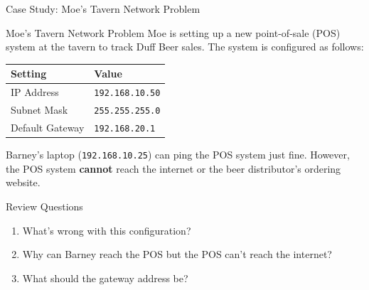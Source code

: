 \documentclass[aspectratio=169]{beamer}  %
\begin{document}
\begin{frame}{Case Study: Moe's Tavern Network Problem}
    \begin{casestudy}{Moe's Tavern Network Problem}
        Moe is setting up a new point-of-sale (POS) system at the tavern to track Duff Beer sales. The system is configured as follows:
        
        \vspace{0.5em}
        \begin{center}
            \scriptsize
            \begin{tabular}{l l}
                \textbf{Setting} & \textbf{Value} \\
                \midrule
                IP Address & \texttt{192.168.10.50} \\
                Subnet Mask & \texttt{255.255.255.0} \\
                Default Gateway & \texttt{192.168.20.1} \\
            \end{tabular}
        \end{center}
        
        Barney's laptop (\texttt{192.168.10.25}) can ping the POS system just fine. However, the POS system \textbf{cannot} reach the internet or the beer distributor's ordering website.
    \end{casestudy}
    
    \begin{block}{Review Questions}
        \begin{enumerate}
            \small
            \item What's wrong with this configuration?
            \item Why can Barney reach the POS but the POS can't reach the internet?
            \item What should the gateway address be?
        \end{enumerate}
    \end{block}
\end{frame}
\end{document}
